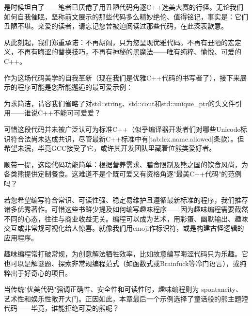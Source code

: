 
是时候坦白了——笔者已厌倦了用丑陋代码角逐C++选美大赛的行径。无论我们如何自我催眠，坚称前文展示的那些代码多么精妙绝伦、值得铭记，事实是：它们丑陋不堪。亲爱的读者，请忘记您曾被迫阅读过那些代码，在此深表歉意。

从此刻起，我们郑重承诺：不再胡闹，只为您呈现优雅代码。不再有丑陋的宏定义，不再有晦涩的替换技巧，不再有神秘的黑魔法——唯有纯粹、愉悦、可爱的C++。

作为这场代码美学的自我革新（现在我们是优雅C++代码的书写者了），接下来展示的程序可能是您所能邂逅的最可爱示例：


为求简洁，请容我们省略了对std::string、std::cout和std::unique\_ptr的头文件引用——谁说C++不能可可爱爱？

可惜这段代码并未被广泛认可为标准C++（似乎编译器开发者们对哪些Unicode标识符合法尚未达成共识，尽管最新C++标准中有[tab:lex.name.allowed]条款）。但希望未泯，毕竟GCC接受了它，或许其开发团队里藏着位熊类爱好者。

顺带一提，这段代码功能简单：根据营养需求、膳食限制及熊之国的饮食风尚，为各类熊提供定制餐食。这难道不是个既可爱又有资格角逐"最美C++代码"的范例吗？

若您希望编写符合常识、可读性强、稳定易维护且遵循最新标准的程序，我们推荐诸多优秀著作。可惜这些书鲜少提及如何编写趣味程序——因为趣味编程需要截然不同的心态，往往与商业收益无关。编程可以成为艺术，用彩蛋、幽默输出、趣味交互或非常规可视化给人惊喜。就像我们用emoji作标识符，或是构建古怪逻辑的应用程序。

趣味编程常打破常规，为创意解法牺牲效率，比如故意编写晦涩代码只为乐趣。它也可以是解谜题、探索非常规编程范式（如函数式或Brainfuck等冷门语言），或纯粹出于好奇心的项目。

当传统"优美代码"强调正确性、安全性和可读性时，趣味编程则为 spontaneity、艺术性和娱乐性敞开大门。正因如此，本章最后一个示例选择了童话般的熊主题短代码——毕竟，谁能拒绝可爱的熊呢？